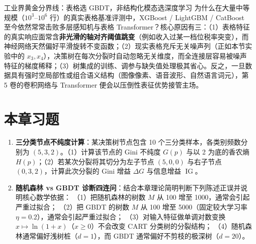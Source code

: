 \begin{insightBox}{工业界黄金分界线：表格选 GBDT，非结构化模态选深度学习}
为什么在大量中等规模（$10^3\text{--}10^6$ 行）的真实表格基准评测中，XGBoost / LightGBM / CatBoost 至今依然常常击败多层感知机与表格 Transformer？核心原因有三：（1）表格特征的真实响应面常含\textbf{非光滑的轴对齐阈值跳变}（例如收入过某一档位税率突变），而神经网络天然偏好平滑旋转不变函数；（2）现实表格充斥无关噪声列（正如本节实验中的 $x_3, x_4$），决策树在每次分裂时自动忽略无关维度，而全连接层容易被噪声特征的梯度稀释；（3）树集成的训练、调参与缺失值处理极其省心。反之，一旦数据具有强时空局部性或组合语义结构（图像像素、语音波形、自然语言词元），第 5 卷的卷积网络与 Transformer 便会以压倒性表征优势接管主场。
\end{insightBox}

\section{本章习题}\label{sec:ch5-ex}


\begin{enumerate}[label=\textbf{5.\arabic*}]
  \item \textbf{三分类节点不纯度计算}：某决策树节点包含 10 个三分类样本，各类别频数分别为 $(5, 3, 2)$。（1）计算该节点的 Gini 不纯度 $G(p)$ 与以 2 为底的香农熵 $H(p)$；（2）若某次分裂将其切分为左子节点 $(5, 0, 0)$ 与右子节点 $(0, 3, 2)$，计算此次分裂的 Gini 增益 $\Delta G$ 与信息增益 $\operatorname{IG}$。

  \item \textbf{随机森林 vs GBDT 诊断四连问}：结合本章理论简明判断下列陈述正误并说明核心数学依据：
  （1）把随机森林的树数 $M$ 从 100 增至 1000，通常会引起严重过拟合；
  （2）把 GBDT 的树数 $M$ 从 100 增至 5000（固定较大学习率 $\eta=0.2$），通常会引起严重过拟合；
  （3）对输入特征做单调对数变换 $x \mapsto \ln(1 + x)$（$x \ge 0$）不会改变 CART 分类树的分裂结构；
  （4）随机森林通常偏好浅树桩（$d=1$），而 GBDT 通常偏好不剪枝的极深树（$d=20$）。
\end{enumerate}


